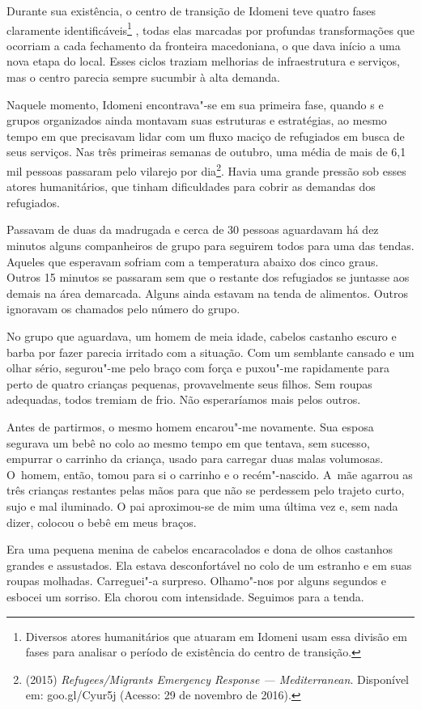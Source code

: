 Durante sua existência, o centro de transição de Idomeni teve quatro
fases claramente identificáveis\footnote{ Diversos atores humanitários que atuaram em Idomeni
usam essa divisão em fases para analisar o período de existência do
centro de transição.} , todas elas marcadas
por profundas transformações que ocorriam a cada fechamento da fronteira
macedoniana, o que dava início a uma nova etapa do local. Esses ciclos
traziam melhorias de infraestrutura e serviços, mas o centro parecia
sempre sucumbir à alta demanda.

Naquele momento, Idomeni encontrava"-se em sua primeira fase, quando s
e grupos organizados ainda montavam suas estruturas e estratégias, ao
mesmo tempo em que precisavam lidar com um fluxo maciço de refugiados em
busca de seus serviços. Nas três primeiras semanas de outubro, uma média
de mais de 6,1 mil pessoas passaram pelo vilarejo por
dia\footnote{  (2015) \emph{Refugees/Migrants Emergency
Response --- Mediterranean}. Disponível em:
goo.gl/Cyur5j (Acesso: 29 de
novembro de 2016).}. Havia uma grande pressão sob esses atores
humanitários, que tinham dificuldades para cobrir as demandas dos
refugiados.

Passavam de duas da madrugada e cerca de 30 pessoas aguardavam há dez
minutos alguns companheiros de grupo para seguirem todos para uma 
das tendas. Aqueles que esperavam sofriam com a temperatura abaixo dos 
cinco graus. Outros 15 minutos se passaram sem que o restante dos refugiados
se juntasse aos demais na área demarcada. Alguns ainda estavam na tenda 
de alimentos. Outros ignoravam os chamados pelo número do grupo.

No grupo que aguardava, um homem de meia idade, cabelos castanho escuro
e barba por fazer parecia irritado com a situação. Com um semblante
cansado e um olhar sério, segurou"-me pelo braço com força e puxou"-me
rapidamente para perto de quatro crianças pequenas, provavelmente seus
filhos. Sem roupas adequadas, todos tremiam de frio. Não esperaríamos
mais pelos outros.

Antes de partirmos, o mesmo homem encarou"-me novamente. Sua esposa
segurava um bebê no colo ao mesmo tempo em que tentava, sem sucesso,
empurrar o carrinho da criança, usado para carregar duas malas volumosas.
 O~homem, então, tomou para si o carrinho e o recém"-nascido. A~mãe
agarrou as três crianças restantes pelas mãos para que não se perdessem
pelo trajeto curto, sujo e mal iluminado. O pai aproximou-se de mim uma última 
vez e, sem nada dizer, colocou o bebê em meus braços.

Era uma pequena menina de cabelos encaracolados e dona de olhos castanhos grandes e assustados.
 Ela estava desconfortável no colo de um estranho
e em suas roupas molhadas. Carreguei"-a surpreso. Olhamo"-nos por alguns
segundos e esbocei um sorriso. Ela chorou com intensidade. Seguimos para
a tenda.

